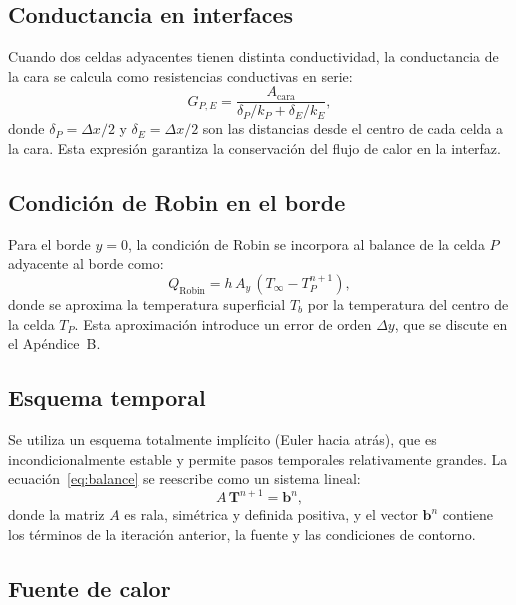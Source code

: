 \documentclass[11pt,a4paper]{article}
\begin{document}
\subsection{Conductancia en interfaces}

Cuando dos celdas adyacentes tienen distinta conductividad, la conductancia de la cara se calcula como resistencias conductivas en serie:
\begin{equation}
G_{P,E} = \frac{A_{\text{cara}}}{\delta_P/k_P + \delta_E/k_E},
\label{eq:interfaz}
\end{equation}
donde $\delta_P = \Delta x/2$ y $\delta_E = \Delta x/2$ son las distancias desde el centro de cada celda a la cara. Esta expresión garantiza la conservación del flujo de calor en la interfaz.

\subsection{Condición de Robin en el borde}

Para el borde $y=0$, la condición de Robin se incorpora al balance de la celda $P$ adyacente al borde como:
\begin{equation}
Q_{\text{Robin}} = h\,A_y\,(T_\infty - T_P^{n+1}),
\label{eq:robin_discreto}
\end{equation}
donde se aproxima la temperatura superficial $T_b$ por la temperatura del centro de la celda $T_P$. Esta aproximación introduce un error de orden $\Delta y$, que se discute en el Apéndice~B.

\subsection{Esquema temporal}

Se utiliza un esquema totalmente implícito (Euler hacia atrás), que es incondicionalmente estable y permite pasos temporales relativamente grandes. La ecuación~\eqref{eq:balance} se reescribe como un sistema lineal:
\begin{equation}
A\,\mathbf{T}^{n+1} = \mathbf{b}^n,
\label{eq:sistema}
\end{equation}
donde la matriz $A$ es rala, simétrica y definida positiva, y el vector $\mathbf{b}^n$ contiene los términos de la iteración anterior, la fuente y las condiciones de contorno.

\subsection{Fuente de calor}
\end{document}
